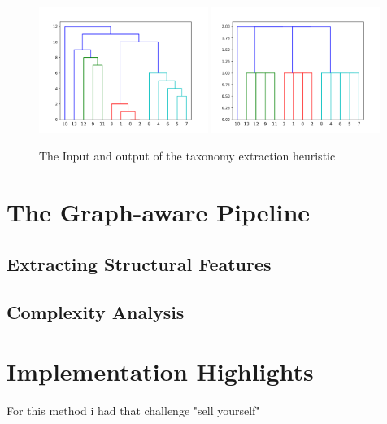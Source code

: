 \begin{figure}[htp]
    \includegraphics[width=0.49\textwidth]{img/extract_ex_dendro.png}
        \includegraphics[width=0.49\textwidth]{img/extract_ex_taxo.png}
    \caption{The Input and output of the taxonomy extraction heuristic}
    \label{fig:my_label}
\end{figure} 
 

\section{The Graph-aware Pipeline}
\subsection{Extracting Structural Features}
\subsection{Complexity Analysis}

\section{Implementation Highlights}
For this method i had that challenge "sell yourself"
 
 
